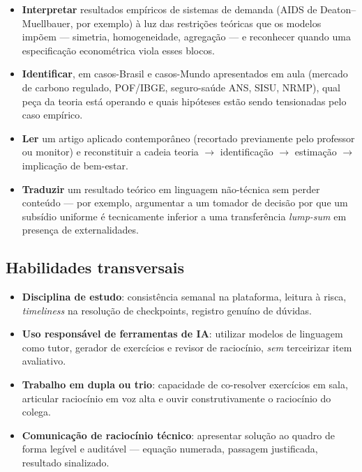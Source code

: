 \documentclass[11pt,a4paper]{article}
\begin{document}
\begin{itemize}
  \item \textbf{Interpretar} resultados empíricos de sistemas de demanda (AIDS de Deaton--Muellbauer, por exemplo) à luz das restrições teóricas que os modelos impõem --- simetria, homogeneidade, agregação --- e reconhecer quando uma especificação econométrica viola esses blocos.
  \item \textbf{Identificar}, em casos-Brasil e casos-Mundo apresentados em aula (mercado de carbono regulado, POF/IBGE, seguro-saúde ANS, SISU, NRMP), qual peça da teoria está operando e quais hipóteses estão sendo tensionadas pelo caso empírico.
  \item \textbf{Ler} um artigo aplicado contemporâneo (recortado previamente pelo professor ou monitor) e reconstituir a cadeia teoria $\to$ identificação $\to$ estimação $\to$ implicação de bem-estar.
  \item \textbf{Traduzir} um resultado teórico em linguagem não-técnica sem perder conteúdo --- por exemplo, argumentar a um tomador de decisão por que um subsídio uniforme é tecnicamente inferior a uma transferência \textit{lump-sum} em presença de externalidades.
\end{itemize}

\subsection*{Habilidades transversais}

\begin{itemize}
  \item \textbf{Disciplina de estudo}: consistência semanal na plataforma, leitura à risca, \textit{timeliness} na resolução de checkpoints, registro genuíno de dúvidas.
  \item \textbf{Uso responsável de ferramentas de IA}: utilizar modelos de linguagem como tutor, gerador de exercícios e revisor de raciocínio, \emph{sem} terceirizar item avaliativo.
  \item \textbf{Trabalho em dupla ou trio}: capacidade de co-resolver exercícios em sala, articular raciocínio em voz alta e ouvir construtivamente o raciocínio do colega.
  \item \textbf{Comunicação de raciocínio técnico}: apresentar solução ao quadro de forma legível e auditável --- equação numerada, passagem justificada, resultado sinalizado.
\end{itemize}

\end{document}
